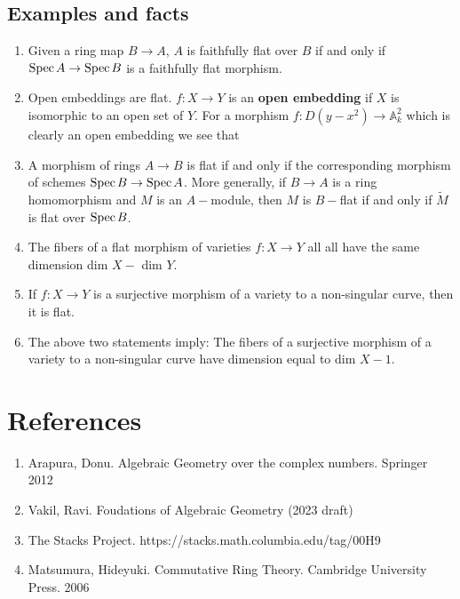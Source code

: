 \documentclass[12pt]{article}
\theoremstyle{mytheoremstyle}
\newcommand{\bA}{\mathbb{A}}
\newcommand{\spec}{\text{Spec\hspace*{.5mm}}}
\begin{document}
\subsection*{Examples and facts}
\begin{enumerate}
    \item Given a ring map $B\to A$, $A$ is faithfully flat over $B$
        if and only if $\spec A\to\spec B$ is a faithfully flat morphism.
    \item Open embeddings are flat. $f:X\to Y$ is an \textbf{open
        embedding} if $X$ is isomorphic to an open set of $Y$. For a
        morphism $f:D(y-x^2)\to \bA^2_k$ which is clearly an open
        embedding we see that 
    \item A morphism of rings $A\to B$ is flat if and only if the
        corresponding morphism of schemes $\spec B\to\spec A$.
        More generally, if $B\to A$ is a ring homomorphism and $M$ is
        an $A-$module, then $M$ is $B-$flat if and only if
        $\widetilde{M}$ is flat over $\spec B$.
    \item The fibers of a flat morphism of varieties $f:X\to Y$ all
        all have the same dimension dim $X-$ dim $Y$. 
    \item If $f:X\to Y$ is a surjective morphism of a variety to
        a non-singular curve, then it is flat.
    \item The above two statements imply: The fibers of a surjective
        morphism of a variety to a non-singular curve have dimension
        equal to dim $X-1$.
\end{enumerate}

\newpage
\section*{References}
\begin{enumerate}
    \item Arapura, Donu. Algebraic Geometry over the complex numbers. Springer 2012
    \item Vakil, Ravi. Foudations of Algebraic Geometry (2023 draft)
    \item The Stacks Project. https://stacks.math.columbia.edu/tag/00H9
    \item Matsumura, Hideyuki. Commutative Ring Theory. Cambridge University Press. 2006
\end{enumerate}

\setcounter{section}{1}
\setcounter{theorem}{1}
\end{document}
